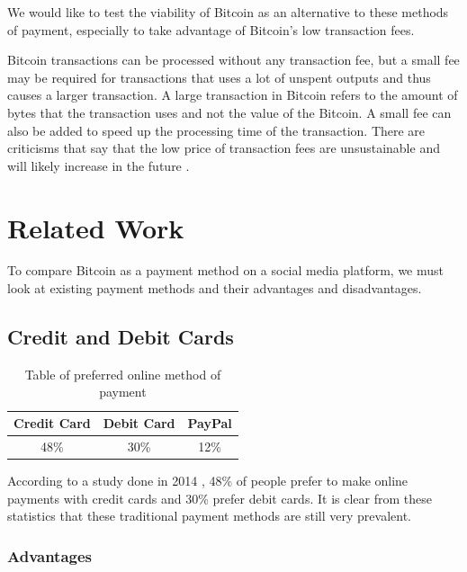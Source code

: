 We would like to test the viability of Bitcoin as an alternative to these methods of payment, especially to take advantage of Bitcoin's low transaction fees.

Bitcoin transactions can be processed without any transaction fee, but a small fee may be required for transactions that uses a lot of unspent outputs and thus causes a larger transaction. A large transaction in Bitcoin refers to the amount of bytes that the transaction uses and not the value of the Bitcoin. A small fee can also be added to speed up the processing time of the transaction. There are criticisms that say that the low price of transaction fees are unsustainable and will likely increase in the future \cite{Ka2014}.



\section{Related Work}

To compare Bitcoin as a payment method on a social media platform, we must look at existing payment methods and their advantages and disadvantages. 

\subsection{Credit and Debit Cards}

\begin{table}
	\begin{center}
		\begin{tabular}	{ | c | c | c |}
		\hline
		Credit Card & Debit Card & PayPal \\ \hline
		48\% & 30\% & 12\% \\ \hline
	 
		\end{tabular}
		\caption{Table of preferred online method of payment \cite{tsys}} 
		\label{tbl:preferred_payment}
	\end{center}
\end{table}

According to a study done in 2014 \cite{tsys}, 48\% of people prefer to make online payments with credit cards and 30\% prefer debit cards. It is clear from these statistics that these traditional payment methods are still very prevalent. 

\subsubsection{Advantages}

